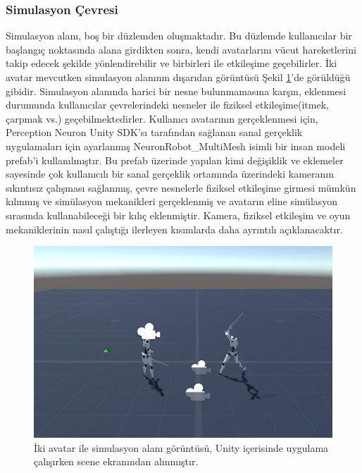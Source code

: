 \documentclass[a4paper, 12pt, titlepage]{article}
\begin{document}
\subsubsection{Simulasyon Çevresi}

Simulasyon alanı, boş bir düzlemden oluşmaktadır. Bu düzlemde kullanıcılar bir başlangıç noktasında
alana girdikten sonra, kendi avatarlarını vücut hareketlerini takip edecek şekilde yönlendirebilir
ve birbirleri ile etkileşime geçebilirler. İki avatar mevcutken simulasyon alanının dışarıdan
görüntüsü Şekil \ref{env}’de görüldüğü gibidir. Simulasyon alanında harici bir nesne bulunmamasına
karşın, eklenmesi durumunda kullanıcılar çevrelerindeki nesneler ile fiziksel etkileşime(itmek,
çarpmak vs.) geçebilmektedirler. Kullanıcı avatarının gerçeklenmesi için, Perception Neuron Unity
SDK’sı tarafından sağlanan sanal gerçeklik uygulamaları için ayarlanmış NeuronRobot\_MultiMesh isimli
bir insan modeli prefab’i kullanılmıştır. Bu prefab üzerinde yapılan kimi değişiklik ve eklemeler
sayesinde çok kullanıcılı bir sanal gerçeklik ortamında üzerindeki kameranın sıkıntısız çalışması
sağlanmış, çevre nesnelerle fiziksel etkileşime girmesi mümkün kılınmış ve simülasyon mekanikleri
gerçeklenmiş ve avatarın eline simülasyon sırasında kullanabileceği bir kılıç eklenmiştir. Kamera,
fiziksel etkileşim ve oyun mekaniklerinin nasıl çalıştığı ilerleyen kısımlarda daha ayrıntılı
açıklanacaktır.

\begin{figure}[hbt!]
    \centering
        \includegraphics[width=6in]{images/env}
    \caption{İki avatar ile simulasyon alanı görüntüsü, Unity içerisinde uygulama çalışırken scene
             ekranından alınmıştır.}
    \label{env}
\end{figure}
\end{document}
